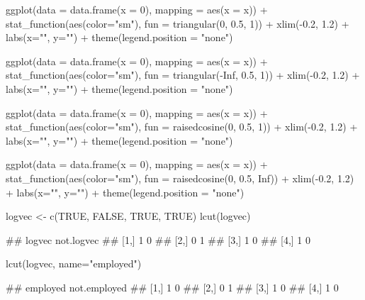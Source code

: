 \documentclass{article}\usepackage[]{graphicx}\usepackage[]{color}
\begin{document}
\begin{Schunk}
\begin{Sinput}
ggplot(data = data.frame(x = 0), mapping = aes(x = x)) +
  stat_function(aes(color="sm"), fun = triangular(0, 0.5, 1)) +
  xlim(-0.2, 1.2) +
  labs(x="", y="") +
  theme(legend.position = "none")
\end{Sinput}
\end{Schunk}

\begin{Schunk}
\begin{Sinput}
ggplot(data = data.frame(x = 0), mapping = aes(x = x)) +
  stat_function(aes(color="sm"), fun = triangular(-Inf, 0.5, 1)) +
  xlim(-0.2, 1.2) +
  labs(x="", y="") +
  theme(legend.position = "none")
\end{Sinput}
\end{Schunk}

\begin{Schunk}
\begin{Sinput}
ggplot(data = data.frame(x = 0), mapping = aes(x = x)) +
  stat_function(aes(color="sm"), fun = raisedcosine(0, 0.5, 1)) +
  xlim(-0.2, 1.2) +
  labs(x="", y="") +
  theme(legend.position = "none")
\end{Sinput}
\end{Schunk}

\begin{Schunk}
\begin{Sinput}
ggplot(data = data.frame(x = 0), mapping = aes(x = x)) +
  stat_function(aes(color="sm"), fun = raisedcosine(0, 0.5, Inf)) +
  xlim(-0.2, 1.2) +
  labs(x="", y="") +
  theme(legend.position = "none")
\end{Sinput}
\end{Schunk}

\begin{Schunk}
% --begin: "lcut.logical"
\begin{Sinput}
logvec <- c(TRUE, FALSE, TRUE, TRUE)
lcut(logvec)
\end{Sinput}
\begin{Soutput}
##      logvec not.logvec
## [1,]      1          0
## [2,]      0          1
## [3,]      1          0
## [4,]      1          0
\end{Soutput}
\begin{Sinput}
lcut(logvec, name="employed")
\end{Sinput}
\begin{Soutput}
##      employed not.employed
## [1,]        1            0
## [2,]        0            1
## [3,]        1            0
## [4,]        1            0
\end{Soutput}
%
% --end: "lcut.logical"
\end{Schunk}
\end{document}
